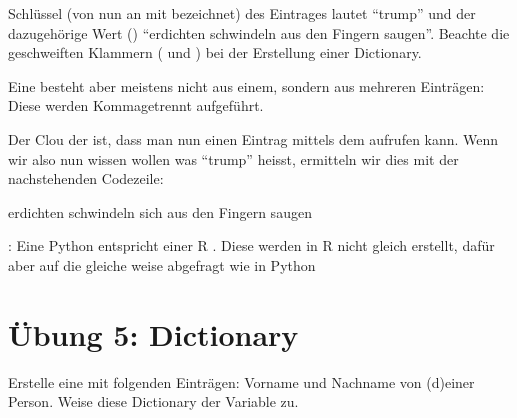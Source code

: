 \documentclass[letterpaper,10pt,english]{sphinxmanual}
\begin{document}
Schlüssel (von nun an mit  bezeichnet) des Eintrages lautet “trump” und der dazugehörige Wert () “erdichten\sphinxhyphen{} schwindeln\sphinxhyphen{} aus den Fingern saugen”. Beachte die geschweiften Klammern (\sphinxcode{\sphinxupquote{\{}} und \sphinxcode{\sphinxupquote{\}}}) bei der Erstellung einer Dictionary.

Eine  besteht aber meistens nicht aus einem, sondern aus mehreren Einträgen: Diese werden Kommagetrennt aufgeführt.

\begin{sphinxVerbatim}[commandchars=\\\{\}]
   
\end{sphinxVerbatim}

Der Clou der  ist, dass man nun einen Eintrag mittels dem  aufrufen kann. Wenn wir also nun wissen wollen was “trump” heisst, ermitteln wir dies mit der nachstehenden Codezeile:

\begin{sphinxVerbatim}[commandchars=\\\{\}]
\PYG{p}{[}\PYG{p}{]}
\end{sphinxVerbatim}

\begin{sphinxVerbatim}[commandchars=\\\{\}]
\PYGZsq{}erdichten\PYGZhy{} schwindeln\PYGZhy{} sich aus den Fingern saugen\PYGZsq{}
\end{sphinxVerbatim}

: Eine Python  entspricht einer R . Diese werden in R nicht gleich erstellt, dafür aber auf die gleiche weise abgefragt wie  in Python


\section{Übung 5: Dictionary}
\label{\detokenize{01_02_Python_Basics:ubung-5-dictionary}}
Erstelle eine  mit folgenden Einträgen: Vorname und Nachname von (d)einer Person. Weise diese Dictionary der Variable  zu.
\end{document}
